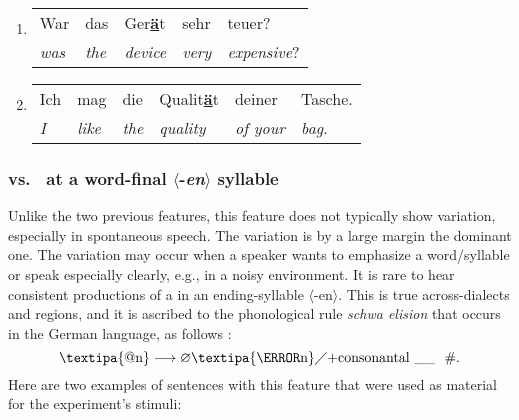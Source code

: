 \begin{enumerate}[label=\arabic{enumi}\alph*), ref=\arabic{enumi}\alph*.)]
	\item 
	\begin{tabulary}{\linewidth}{LLLLL}
		War 		 & das 			& Ger\textbf{\underline{ä}}t & sehr			 & teuer?\\
		\textit{was} & \textit{the} & \textit{device}			 & \textit{very} & \textit{expensive}?\\
	\end{tabulary}
	\item
	\begin{tabulary}{\linewidth}{LLLLLL}
		Ich		   & mag 			& die 			& Qualit\textbf{\underline{ä}}t & deiner		   & Tasche.\\
		\textit{I} & \textit{like}  & \textit{the}  & \textit{quality} 				& \textit{of your} & \textit{bag}.\\
	\end{tabulary}
\end{enumerate}
	
\subsubsection*{\textipa{[@n]} vs.\ \textipa{[\s{n}]} at a word-final $\langle$-\textit{en}$\rangle$ syllable}

Unlike the two previous features, this feature does not typically show variation, especially in spontaneous speech.
The \textipa{[\s{n}]} variation is by a large margin the dominant one.
The \textipa{[@n]} variation may occur when a speaker wants to emphasize a word/syllable or speak especially clearly, e.g., in a noisy environment.
It is rare to hear consistent productions of a \textipa{[@n]} in an ending-syllable $\langle$-en$\rangle$.
This is true across-dialects and regions, and it is ascribed to the phonological rule \textit{schwa elision} that occurs in the German language, as follows \citep[adapted from][pp.~142--143]{Benware1986phonetics}:
%
\begin{equation}
	\text{\textipa{@n}}\longrightarrow \varnothing \text{\textipa{\s{n}}} \diagup
	\text{+consonantal} \ \_\_ \ \ \text{\#} .
	\label{eq:schwa_elision_rule}
\end{equation}
%	
Here are two examples of sentences with this feature that were used as material for the experiment's stimuli:

